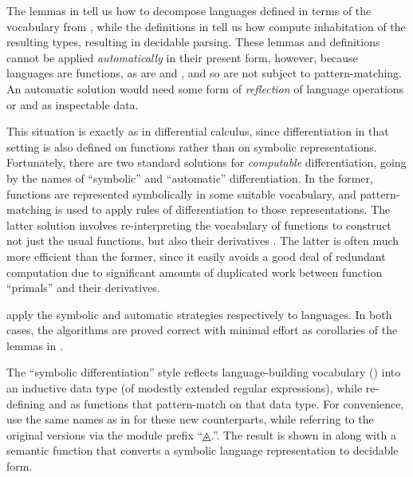 \documentclass[acmsmall,screen]{acmart}
\begin{document}

The lemmas in  tell us how to decompose languages defined in terms of the vocabulary from , while the definitions in  tell us how compute inhabitation of the resulting types, resulting in decidable parsing.
These lemmas and definitions cannot be applied \emph{automatically} in their present form, however, because languages are functions, as are  and , and so are not subject to pattern-matching.
An automatic solution would need some form of \emph{reflection} of language operations or  and  as inspectable data.

This situation is exactly as in differential calculus, since differentiation in that setting is also defined on functions rather than on symbolic representations.
Fortunately, there are two standard solutions for \emph{computable} differentiation, going by the names of ``symbolic'' and ``automatic'' differentiation.
In the former, functions are represented symbolically in some suitable vocabulary, and pattern-matching is used to apply rules of differentiation to those representations.
The latter solution involves re-interpreting the vocabulary of functions to construct not just the usual functions, but also their derivatives \needcite{}.
The latter is often much more efficient than the former, since it easily avoids a good deal of redundant computation due to significant amounts of duplicated work between function ``primals'' and their derivatives.

 apply the symbolic and automatic strategies respectively to languages.
In both cases, the algorithms are proved correct with minimal effort as corollaries of the lemmas in .

\rnc{}

\nc{}

The ``symbolic differentiation'' style reflects language-building vocabulary () into an inductive data type (of modestly extended regular expressions), while re-defining  and  as functions that pattern-match on that data type.
For convenience, use the same names as in  for these new counterparts, while referring to the original versions via the module prefix ``{◬.}\hspace{0.05em}''.
The result is shown in  along with a semantic function {} that converts a symbolic language representation to decidable form.
\end{document}
